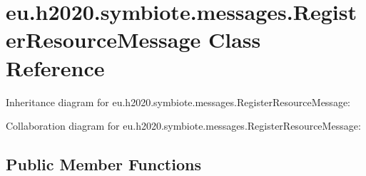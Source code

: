 \hypertarget{classeu_1_1h2020_1_1symbiote_1_1messages_1_1RegisterResourceMessage}{}\section{eu.\+h2020.\+symbiote.\+messages.\+Register\+Resource\+Message Class Reference}
\label{classeu_1_1h2020_1_1symbiote_1_1messages_1_1RegisterResourceMessage}


Inheritance diagram for eu.\+h2020.\+symbiote.\+messages.\+Register\+Resource\+Message\+:


Collaboration diagram for eu.\+h2020.\+symbiote.\+messages.\+Register\+Resource\+Message\+:
\subsection*{Public Member Functions}
